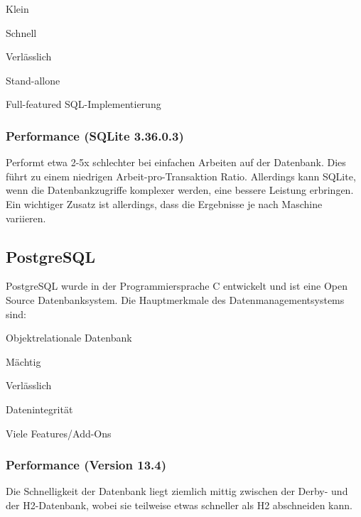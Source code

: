 \begin{compactitem}
    \item Klein
    \item Schnell        
    \item Verlässlich
    \item Stand-allone
    \item Full-featured SQL-Implementierung
\end{compactitem} 
\cite{sqlliteOfficialSite}

\subsubsection{Performance (SQLite 3.36.0.3)}
Performt etwa 2-5x schlechter bei einfachen Arbeiten auf der Datenbank. Dies führt zu einem niedrigen Arbeit-pro-Transaktion Ratio. Allerdings kann SQLite, wenn die Datenbankzugriffe komplexer werden, eine bessere Leistung erbringen. Ein wichtiger Zusatz ist allerdings, dass die Ergebnisse je nach Maschine variieren. \cite{databaseComparison}



\subsection{PostgreSQL}

PostgreSQL wurde in der Programmiersprache C entwickelt und ist eine Open Source Datenbanksystem. Die Hauptmerkmale des Datenmanagementsystems sind:

\begin{compactitem}
    \item Objektrelationale Datenbank        
    \item Mächtig
    \item Verlässlich
    \item Datenintegrität
    \item Viele Features/Add-Ons
\end{compactitem}
\cite{PostgreSQLOfficialSite}

\subsubsection{Performance (Version 13.4)}
Die Schnelligkeit der Datenbank liegt ziemlich mittig zwischen der Derby- und der H2-Datenbank, wobei sie teilweise etwas schneller als H2 abschneiden kann. \cite{databaseComparison}

